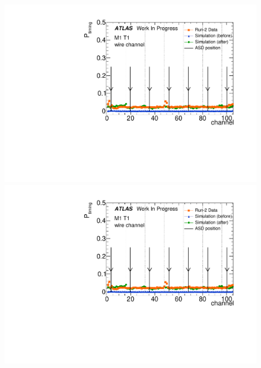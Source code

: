 \begin{figure}[htbp]
\begin{minipage}{0.49\hsize}
		\end{minipage}\\
		\begin{minipage}{0.49\hsize}
		\centering
		\includegraphics[width=\textwidth,page=16]{img/pdf5/master_timingplot_comp.pdf}
		\end{minipage}
		\begin{minipage}{0.49\hsize}
		\centering
		\includegraphics[width=\textwidth,page=18]{img/pdf5/master_timingplot_comp.pdf}
	    \end{minipage}\\
	    \begin{minipage}{0.49\hsize}
		\centering

\end{minipage}
\end{figure}

